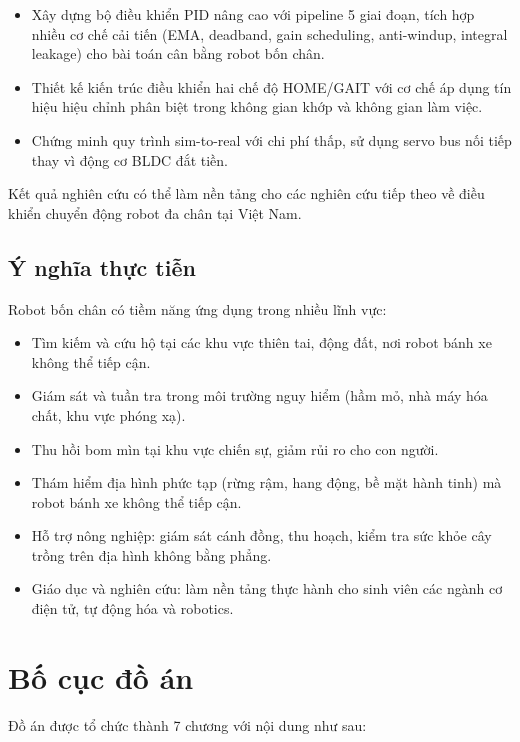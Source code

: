 \begin{itemize}
    \item Xây dựng bộ điều khiển PID nâng cao với pipeline 5 giai đoạn, tích hợp nhiều cơ chế cải tiến (EMA, deadband, gain scheduling, anti-windup, integral leakage) cho bài toán cân bằng robot bốn chân.
    \item Thiết kế kiến trúc điều khiển hai chế độ HOME/GAIT với cơ chế áp dụng tín hiệu hiệu chỉnh phân biệt trong không gian khớp và không gian làm việc.
    \item Chứng minh quy trình sim-to-real với chi phí thấp, sử dụng servo bus nối tiếp thay vì động cơ BLDC đắt tiền.
\end{itemize}

Kết quả nghiên cứu có thể làm nền tảng cho các nghiên cứu tiếp theo về điều khiển chuyển động robot đa chân tại Việt Nam.

\subsection{Ý nghĩa thực tiễn}
Robot bốn chân có tiềm năng ứng dụng trong nhiều lĩnh vực:
\begin{itemize}
    \item Tìm kiếm và cứu hộ tại các khu vực thiên tai, động đất, nơi robot bánh xe không thể tiếp cận.
    \item Giám sát và tuần tra trong môi trường nguy hiểm (hầm mỏ, nhà máy hóa chất, khu vực phóng xạ).
    \item Thu hồi bom mìn tại khu vực chiến sự, giảm rủi ro cho con người.
    \item Thám hiểm địa hình phức tạp (rừng rậm, hang động, bề mặt hành tinh) mà robot bánh xe không thể tiếp cận.
    \item Hỗ trợ nông nghiệp: giám sát cánh đồng, thu hoạch, kiểm tra sức khỏe cây trồng trên địa hình không bằng phẳng.
    \item Giáo dục và nghiên cứu: làm nền tảng thực hành cho sinh viên các ngành cơ điện tử, tự động hóa và robotics.
\end{itemize}

\section{Bố cục đồ án}

Đồ án được tổ chức thành 7 chương với nội dung như sau:

